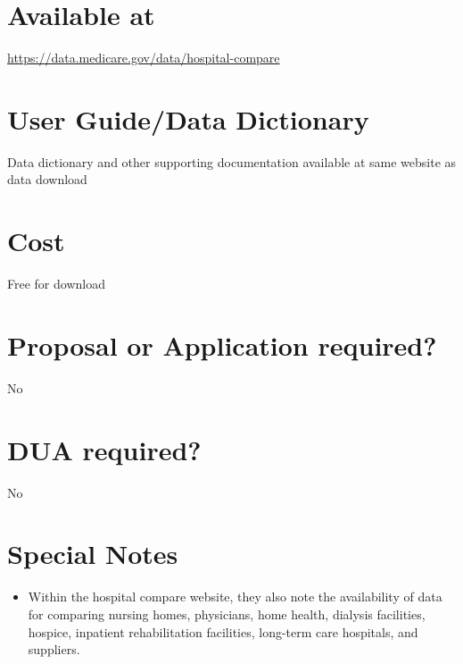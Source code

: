 \documentclass[
]{book}
\providecommand{\tightlist}{%
  \setlength{\itemsep}{0pt}\setlength{\parskip}{0pt}}
\begin{document}
\hypertarget{available-at-33}{%
\section{Available at}\label{available-at-33}}

\url{https://data.medicare.gov/data/hospital-compare}

\hypertarget{user-guidedata-dictionary-33}{%
\section{User Guide/Data Dictionary}\label{user-guidedata-dictionary-33}}

Data dictionary and other supporting documentation available at same website as data download

\hypertarget{cost-33}{%
\section{Cost}\label{cost-33}}

Free for download

\hypertarget{proposal-or-application-required-33}{%
\section{Proposal or Application required?}\label{proposal-or-application-required-33}}

No

\hypertarget{dua-required-33}{%
\section{DUA required?}\label{dua-required-33}}

No

\hypertarget{special-notes-33}{%
\section{Special Notes}\label{special-notes-33}}

\begin{itemize}
\tightlist
\item
  Within the hospital compare website, they also note the availability of data for comparing nursing homes, physicians, home health, dialysis facilities, hospice, inpatient rehabilitation facilities, long-term care hospitals, and suppliers.
\end{itemize}

\mainmatter
\end{document}
